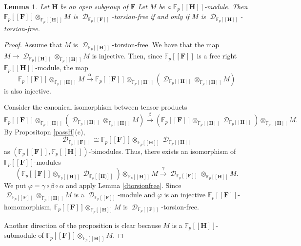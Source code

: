 \documentclass[11pt]{amsart}
\newtheorem{lem}{Lemma}[section]
\numberwithin{claimcounter}{lem}
\DeclareMathOperator{\D}{\mathcal D}
\newcommand{\F}{\mathbb{F}}
\begin{document}
\begin{lem} \label{extprop} Let $\mathbf H$ be an open   subgroup of $\mathbf F$
Let $M$ be a $\F_p[[\mathbf H]]$-module. Then $\F_p[[\mathbf F]]\otimes_{\F_p[[\mathbf H]]} M$ is $\D_{\F_p[[\mathbf F]]}$-torsion-free if and only if $M$ is $\D_{\F_p[[\mathbf H]]}$-torsion-free.

\end{lem}
\begin{proof} Assume that $M$ is $\D_{\F_p[[\mathbf H]]}$-torsion-free.
We have  that the map $ M\to \D_{\F_p[[\mathbf H]]}\otimes_{\F_p[[\mathbf H]]}M$ is injective. Then, since $\F_p[[\mathbf F]]$ is a free right $\F_p[[\mathbf H]]$-module, the map
$$\F_p[[\mathbf F]]\otimes_{\F_p[[\mathbf H]]}M\xrightarrow {\alpha}\F_p[[\mathbf F]]\otimes_{\F_p[[\mathbf H]]}( \D_{\F_p[[\mathbf H]]}\otimes_{\F_p[[\mathbf H]]} M)$$ is also injective. 

Consider  the canonical isomorphism between tensor products 
$$\F_p[[\mathbf F]]\otimes_{\F_p[[\mathbf H]]}( \D_{\F_p[[\mathbf H]]}\otimes_{\F_p[[\mathbf H]]} M)\xrightarrow {\beta} (\F_p[[\mathbf F]]\otimes_{\F_p[[\mathbf H]]} \D_{\F_p[[\mathbf H]]})\otimes_{\F_p[[\mathbf H]]} M.$$ 
By Propositopn \ref{passH}(c), 
 $$\D_{\F_p[[\mathbf F]]}\cong \F_p[[\mathbf F]]\otimes_{\F_p[[\mathbf H]]} \D_{\F_p[[\mathbf H]]}$$ 
as $(\F_p[[\mathbf F]],\F_p[[\mathbf H]])$-bimodules. Thus, there exists an isomorphism of $\F_p[[\mathbf F]]$-modules
$$ (\F_p[[\mathbf F]]\otimes_{\F_p[[\mathbf H]]} \D_{\F_p[[\mathbf H)]]})\otimes_{\F_p[[\mathbf H]]}M \xrightarrow {\gamma}  \D_{\F_p[[\mathbf F]]}\otimes_{\F_p[[\mathbf H]]} M.$$ 
We put $\varphi=\gamma\circ \beta\circ \alpha$ and apply Lemma \ref{dtorsionfree}. Since $  \D_{\F_p[[\mathbf F]]}\otimes_{\F_p[[\mathbf H]]} M$ is a $\D_{\F_p[[\mathbf F]]}$-module and $\varphi$ is an injective $\F_p[[\mathbf F]]$-homomorphism, $\F_p[[\mathbf F]]\otimes_{\F_p[[\mathbf H]]} M$ is $\D_{\F_p[[\mathbf F]]}$-torsion-free. 

Another direction of the proposition is clear because $M$ is a $\F_p[[\mathbf H]]$-submodule of $\F_p[[\mathbf F]]\otimes_{\F_p[[\mathbf H]]} M$.\end{proof}
\end{document}
